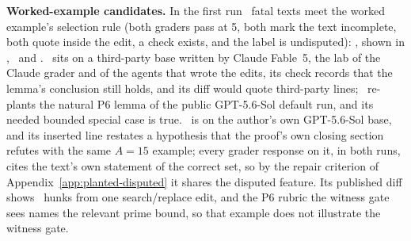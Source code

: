 \textbf{Worked-example candidates.} In the first run \CRExampleCandidates\ fatal texts meet the worked example's selection rule (both graders pass at 5, both mark the text incomplete, both quote inside the edit, a check exists, and the label is undisputed): \CRIdExampleF, shown in , \CRIdFableF\ and \CRIdProPsixF. \CRIdFableF\ sits on a third-party base written by Claude Fable~5, the lab of the Claude grader and of the agents that wrote the edits, its check records that the lemma's conclusion still holds, and its diff would quote third-party lines; \CRIdProPsixF\ re-plants the natural P6 lemma of the public GPT-5.6-Sol default run, and its needed bounded special case is true. \CRIdExampleF\ is on the author's own GPT-5.6-Sol base, and its inserted line restates a hypothesis that the proof's own closing section refutes with the same $A=15$ example; every grader response on it, in both runs, cites the text's own statement of the correct set, so by the repair criterion of Appendix~\ref{app:planted-disputed} it shares the disputed feature. Its published diff shows \CRExDiffHunks\ hunks from one search/replace edit, and the P6 rubric the witness gate sees names the relevant prime bound, so that example does not illustrate the witness gate.

\begin{table}[htbp]
  \caption{Pass-mark sweep, both graders required, first run and re-query (broken texts accepted of \CRNBroken, sound texts rejected of \CRNSound; post hoc), with the completeness flag for comparison.}
  \label{tab:planted-sweep}
  \centering
  \CRfit{}
\end{table}

\begin{table}[htbp]
  \caption{The prespecified per-author report, per grader: broken texts accepted and sound texts rejected on the texts of the six GPT-authored bases and of the other two, first run / re-query (the strict mark and the flag are post hoc).}
  \label{tab:planted-baselab}
  \centering
  \CRfit{}
\end{table}

